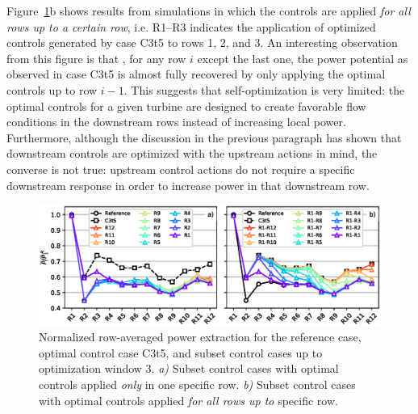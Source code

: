 \documentclass[wes, manuscript]{copernicus}
\begin{document}
Figure~\ref{fig:multirow}b shows results from simulations in which the controls are applied \emph{for all rows up to a certain row}, i.e. R1--R3 indicates the application of optimized controls generated by case C3t5 to rows 1, 2, and 3. An interesting observation from this figure is that , for any row $i$ except the last one, the power potential as observed in case C3t5 is almost fully recovered by only applying the optimal controls up to row $i-1$. This suggests that self-optimization is very limited: the optimal controls for a given turbine are designed to create favorable flow conditions in the downstream rows instead of increasing local power. Furthermore, although the discussion in the previous paragraph has shown that downstream controls are optimized with the upstream actions in mind, the converse is not true: upstream control actions do not require a specific downstream response in order to increase power in that downstream row. 

\begin{figure}
	\includegraphics[width=\textwidth]{figure8}
	\caption{Normalized row-averaged power extraction for the reference case, optimal control case C3t5, and subset control cases up to optimization window 3. \emph{a)} Subset control cases with optimal controls applied \emph{only} in one specific row. \emph{b)} Subset control cases with optimal controls applied \emph{for all rows up to} specific row. \label{fig:multirow}}
\end{figure}
\end{document}

